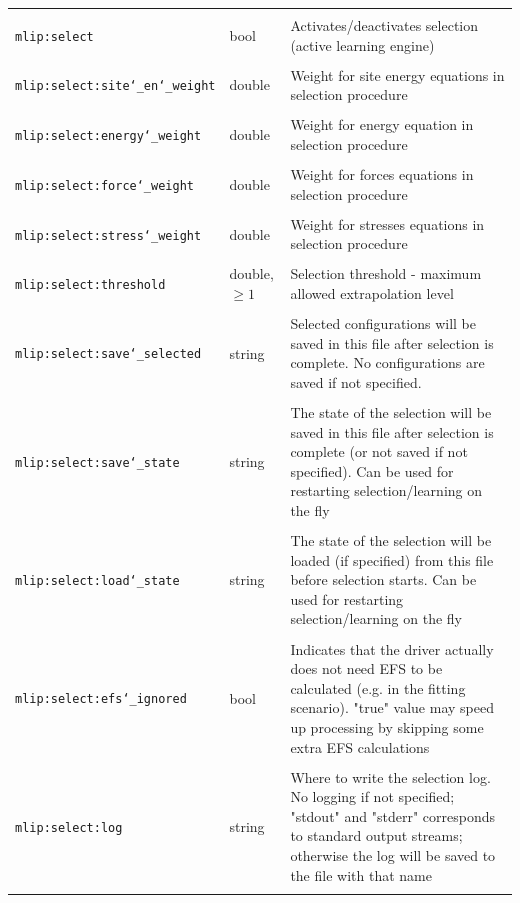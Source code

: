 \documentclass[12pt]{article}
\renewcommand{\_}{\char`_}
\begin{document}
{\begin{longtable}{| p{\largestoption} | p{3.5em} | p{\descriptionlength} |}
&&\\
		\texttt{mlip:select}& bool &		Activates/deactivates selection (active learning engine)\\
&&\\
		\texttt{mlip:select:site\_en\_weight}&double&	Weight for site energy equations in selection procedure\\
&&\\
		\texttt{mlip:select:energy\_weight}&double&	Weight for energy equation in selection procedure\\
&&\\
		\texttt{mlip:select:force\_weight}&double&	Weight for forces equations in selection procedure\\
&&\\
		\texttt{mlip:select:stress\_weight}&double&	Weight for stresses equations in selection procedure\\
&&\\
		\texttt{mlip:select:threshold}&double, $\geq1$&	Selection threshold - maximum allowed extrapolation level\\
&&\\
		\texttt{mlip:select:save\_selected}&string&	Selected configurations will be saved in this file after selection is complete. No configurations are saved if not specified.\\
&&\\
		\texttt{mlip:select:save\_state}&string&	The state of the selection will be saved in this file after selection is complete (or not saved if not specified). Can be used for restarting selection/learning on the fly\\
&&\\
		\texttt{mlip:select:load\_state}&string&	The state of the selection will be loaded (if specified) from this file before selection starts. Can be used for restarting selection/learning on the fly\\
&&\\
		\texttt{mlip:select:efs\_ignored}&bool&Indicates that the driver actually does not need EFS to be calculated (e.g. in the fitting scenario). "true" value may speed up processing by skipping some extra EFS calculations\\
&&\\
		\texttt{mlip:select:log}&string&	Where to write the selection log. No logging if not specified; "stdout" and "stderr" corresponds to standard output streams; otherwise the log will be saved to the file with that name\\
&&\\

\end{longtable}}
\end{document}
